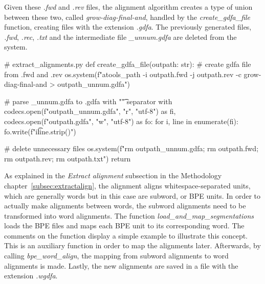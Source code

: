 Given these \emph{.fwd} and \emph{.rev} files, the alignment algorithm creates a type of union between these two, called \emph{grow-diag-final-and}, handled by the \emph{create\_gdfa\_file} function, creating files with the extension \emph{.gdfa}. The previously generated files, \emph{.fwd}, \emph{.rec}, \emph{.txt} and the intermediate file \emph{\_unnum.gdfa} are deleted from the system. 

\begin{python}
# extract_alignments.py
def create_gdfa_file(outpath: str):
  # create gdfa file from .fwd and .rev
  os.system(f"{atools_path} -i {outpath}.fwd -j {outpath}.rev -c grow-diag-final-and > {outpath}_unnum.gdfa")

  # parse _unnum.gdfa to .gdfa with "\t" separator
  with codecs.open(f"{outpath}_unnum.gdfa", "r", "utf-8") as fi, codecs.open(f"{outpath}.gdfa", "w", "utf-8") as fo:
    for i, line in enumerate(fi):
      fo.write(f"{i}\t{line.strip()}\n")

  # delete unnecessary files
  os.system(f"rm {outpath}_unnum.gdfa; rm {outpath}.fwd; rm {outpath}.rev; rm {outpath}.txt")
  return
\end{python}

As explained in the \textit{Extract alignment} subsection in the Methodology chapter~\ref{subsec:extractalign}, the alignment aligns whitespace-separated units, which are generally words but in this case are subword, or BPE units. In order to actually make alignments between words, the subword alignments need to be transformed into word alignments. The function \emph{load\_and\_map\_segmentations} loads the BPE files and maps each BPE unit to its corresponding word. The comments on the function display a simple example to illustrate this concept. This is an auxiliary function in order to map the alignments later. Afterwards, by calling \emph{bpe\_word\_align}, the mapping from subword alignments to word alignments is made. Lastly, the new alignments are saved in a file with the extension \emph{.wgdfa}.

